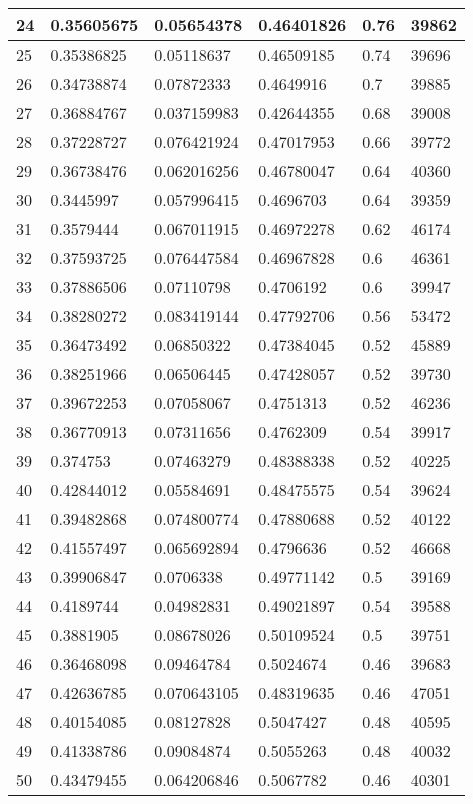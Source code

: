 \begin{longtable}{|l|l|l|l|l|l|}
24 & 0.35605675 & 0.05654378 & 0.46401826 & 0.76 & 39862 \\ \hline 
25 & 0.35386825 & 0.05118637 & 0.46509185 & 0.74 & 39696 \\ \hline 
26 & 0.34738874 & 0.07872333 & 0.4649916 & 0.7 & 39885 \\ \hline 
27 & 0.36884767 & 0.037159983 & 0.42644355 & 0.68 & 39008 \\ \hline 
28 & 0.37228727 & 0.076421924 & 0.47017953 & 0.66 & 39772 \\ \hline 
29 & 0.36738476 & 0.062016256 & 0.46780047 & 0.64 & 40360 \\ \hline 
30 & 0.3445997 & 0.057996415 & 0.4696703 & 0.64 & 39359 \\ \hline 
31 & 0.3579444 & 0.067011915 & 0.46972278 & 0.62 & 46174 \\ \hline 
32 & 0.37593725 & 0.076447584 & 0.46967828 & 0.6 & 46361 \\ \hline 
33 & 0.37886506 & 0.07110798 & 0.4706192 & 0.6 & 39947 \\ \hline 
34 & 0.38280272 & 0.083419144 & 0.47792706 & 0.56 & 53472 \\ \hline 
35 & 0.36473492 & 0.06850322 & 0.47384045 & 0.52 & 45889 \\ \hline 
36 & 0.38251966 & 0.06506445 & 0.47428057 & 0.52 & 39730 \\ \hline 
37 & 0.39672253 & 0.07058067 & 0.4751313 & 0.52 & 46236 \\ \hline 
38 & 0.36770913 & 0.07311656 & 0.4762309 & 0.54 & 39917 \\ \hline 
39 & 0.374753 & 0.07463279 & 0.48388338 & 0.52 & 40225 \\ \hline 
40 & 0.42844012 & 0.05584691 & 0.48475575 & 0.54 & 39624 \\ \hline 
41 & 0.39482868 & 0.074800774 & 0.47880688 & 0.52 & 40122 \\ \hline 
42 & 0.41557497 & 0.065692894 & 0.4796636 & 0.52 & 46668 \\ \hline 
43 & 0.39906847 & 0.0706338 & 0.49771142 & 0.5 & 39169 \\ \hline 
44 & 0.4189744 & 0.04982831 & 0.49021897 & 0.54 & 39588 \\ \hline 
45 & 0.3881905 & 0.08678026 & 0.50109524 & 0.5 & 39751 \\ \hline 
46 & 0.36468098 & 0.09464784 & 0.5024674 & 0.46 & 39683 \\ \hline 
47 & 0.42636785 & 0.070643105 & 0.48319635 & 0.46 & 47051 \\ \hline 
48 & 0.40154085 & 0.08127828 & 0.5047427 & 0.48 & 40595 \\ \hline 
49 & 0.41338786 & 0.09084874 & 0.5055263 & 0.48 & 40032 \\ \hline 
50 & 0.43479455 & 0.064206846 & 0.5067782 & 0.46 & 40301 \\ \hline 
\end{longtable}